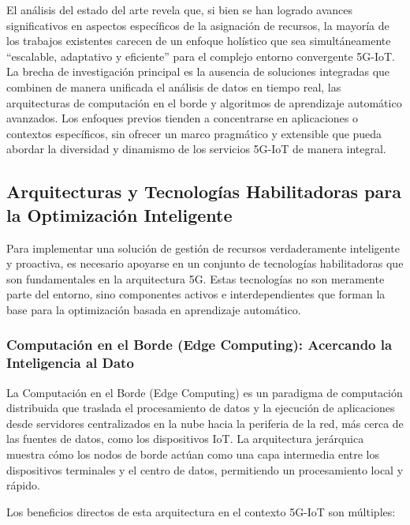 \documentclass[12pt,a4paper]{article}
\begin{document}
El análisis del estado del arte revela que, si bien se han logrado avances significativos en aspectos específicos de la asignación de recursos, la mayoría de los trabajos existentes carecen de un enfoque holístico que sea simultáneamente ``escalable, adaptativo y eficiente'' para el complejo entorno convergente 5G-IoT. La brecha de investigación principal es la ausencia de soluciones integradas que combinen de manera unificada el análisis de datos en tiempo real, las arquitecturas de computación en el borde y algoritmos de aprendizaje automático avanzados. Los enfoques previos tienden a concentrarse en aplicaciones o contextos específicos, sin ofrecer un marco pragmático y extensible que pueda abordar la diversidad y dinamismo de los servicios 5G-IoT de manera integral.

\subsection{Arquitecturas y Tecnologías Habilitadoras para la Optimización Inteligente}

Para implementar una solución de gestión de recursos verdaderamente inteligente y proactiva, es necesario apoyarse en un conjunto de tecnologías habilitadoras que son fundamentales en la arquitectura 5G. Estas tecnologías no son meramente parte del entorno, sino componentes activos e interdependientes que forman la base para la optimización basada en aprendizaje automático.

\subsubsection{Computación en el Borde (Edge Computing): Acercando la Inteligencia al Dato}

La Computación en el Borde (Edge Computing) es un paradigma de computación distribuida que traslada el procesamiento de datos y la ejecución de aplicaciones desde servidores centralizados en la nube hacia la periferia de la red, más cerca de las fuentes de datos, como los dispositivos IoT\cite{ref9}. La arquitectura jerárquica muestra cómo los nodos de borde actúan como una capa intermedia entre los dispositivos terminales y el centro de datos, permitiendo un procesamiento local y rápido.

Los beneficios directos de esta arquitectura en el contexto 5G-IoT son múltiples:
\end{document}
